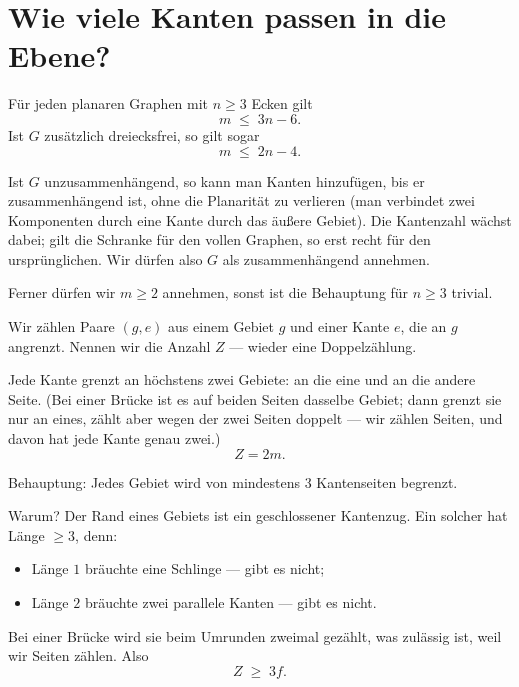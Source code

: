 \section{Wie viele Kanten passen in die Ebene?}

\begin{merksatz}
Für jeden planaren Graphen mit $n \ge 3$ Ecken gilt
\[ m \;\le\; 3n - 6 . \]
Ist $G$ zusätzlich dreiecksfrei, so gilt sogar
\[ m \;\le\; 2n - 4 . \]
\end{merksatz}

\begin{merksatz}
Ist $G$ unzusammenhängend, so kann man Kanten hinzufügen, bis er zusammenhängend ist, ohne die Planarität zu verlieren (man verbindet zwei Komponenten durch eine Kante durch das äußere Gebiet). Die Kantenzahl wächst dabei; gilt die Schranke für den vollen Graphen, so erst recht für den ursprünglichen. Wir dürfen also $G$ als zusammenhängend annehmen.

Ferner dürfen wir $m \ge 2$ annehmen, sonst ist die Behauptung für $n \ge 3$ trivial.

Wir zählen Paare $(g, e)$ aus einem Gebiet $g$ und einer Kante $e$, die an $g$ angrenzt. Nennen wir die Anzahl $Z$ --- wieder eine Doppelzählung.

Jede Kante grenzt an höchstens zwei Gebiete: an die eine und an die andere Seite. (Bei einer Brücke ist es auf beiden Seiten dasselbe Gebiet; dann grenzt sie nur an eines, zählt aber wegen der zwei Seiten doppelt --- wir zählen Seiten, und davon hat jede Kante genau zwei.)
\[ Z = 2m . \]

Behauptung: Jedes Gebiet wird von mindestens $3$ Kantenseiten begrenzt.

Warum? Der Rand eines Gebiets ist ein geschlossener Kantenzug. Ein solcher hat Länge $\ge 3$, denn:
\begin{itemize}[leftmargin=1.4em, itemsep=2pt]
\item Länge $1$ bräuchte eine Schlinge --- gibt es nicht;
\item Länge $2$ bräuchte zwei parallele Kanten --- gibt es nicht.
\end{itemize}
Bei einer Brücke wird sie beim Umrunden zweimal gezählt, was zulässig ist, weil wir Seiten zählen. Also
\[ Z \;\ge\; 3f . \]


\end{merksatz}
